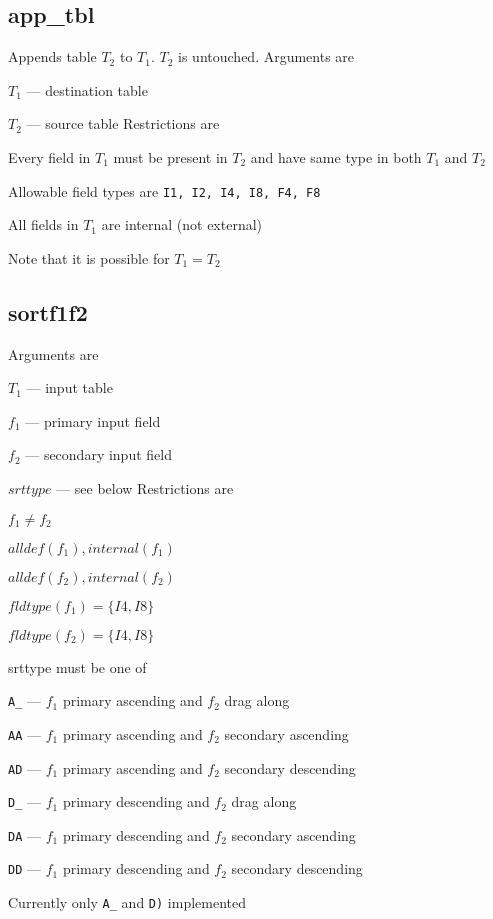 \subsection{app\_tbl}
\label{app_tbl}

Appends table \(T_2\) to \(T_1\). \(T_2\) is untouched. 
Arguments are
\be
\item \(T_1\) --- destination table 
\item \(T_2\) --- source table
\ee
Restrictions are
\be
\item Every field in \(T_1\) must be present in \(T_2\) and have same
type in both \(T_1\) and \(T_2\)
\item Allowable field types are {\tt I1, I2, I4, I8, F4, F8}
\item All fields in \(T_1\) are internal (not external)
\item Note that it is possible for \(T_1 = T_2\)
\ee

\subsection{sortf1f2}
\label{sortf1f2}

Arguments are
\be
\item \(T_1\) --- input table 
\item \(f_1\) --- primary input field 
\item \(f_2\) --- secondary input field 
\item \(srttype\) --- see below
\ee
Restrictions are
\be
\item \(f_1 \neq f_2\)
\item \(alldef(f_1), internal(f_1)\)
\item \(alldef(f_2), internal(f_2)\)
\item \(fldtype(f_1) = \{I4, I8\}\)
\item \(fldtype(f_2) = \{I4, I8\}\)
\item srttype must be one of 
\be
\item \verb+A_+ --- \(f_1\) primary ascending and \(f_2\) drag along
\item \verb+AA+ --- \(f_1\) primary ascending and \(f_2\) secondary ascending
\item \verb+AD+ --- \(f_1\) primary ascending and \(f_2\) secondary descending
\item \verb+D_+ --- \(f_1\) primary descending and \(f_2\) drag along
\item \verb+DA+ --- \(f_1\) primary descending and \(f_2\) secondary ascending
\item \verb+DD+ --- \(f_1\) primary descending and \(f_2\) secondary descending
\ee
\item Currently only \verb+A_+ and \verb+D)+ implemented
\ee

